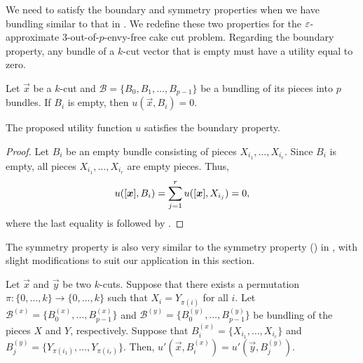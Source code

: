 We need to satisfy the boundary and symmetry properties when we have bundling similar to that in . We redefine these two properties for the $\varepsilon$-approximate 3-out-of-$p$-envy-free cake cut problem. Regarding the boundary property, any bundle of a $k$-cut vector that is empty must have a utility equal to zero.


\begin{property}[Boundary]\label{prt:boundary-condition-2}
    Let $\vec{x}$ be a $k$-cut and $\mathcal{B} = \{B_0, B_1, \ldots, B_{p-1} \}$ be a bundling of its pieces into $p$ bundles. If $B_i$ is empty, then $u(\vec{x}, B_i) = 0$. 
\end{property}

\begin{claim}\label{clm:boundary-condition-hold-2}
    The proposed utility function $u$ 
    satisfies the boundary property.    
\end{claim}

\begin{proof}
    Let $B_i$ be an empty bundle consisting of pieces $ X_{i_1}, \ldots, X_{i_r}$. Since $B_i$ is empty, all pieces $X_{i_1}, \ldots, X_{i_r}$ are empty pieces. Thus,
    \begin{align*}
        u([\boldsymbol{x}], B_i) = \sum_{j=1}^r u([\boldsymbol{x}], X_{i_j}) = 0,
    \end{align*}
    where the last equality is followed by .
\end{proof}











The symmetry property is also very similar to the symmetry property () in , with slight modifications to suit our application in this section.


\begin{property}[symmetry]\label{prt:first-symmetric-2}
    Let $\vec{x}$ and $\vec{y}$ be two $k$-cuts. Suppose that there exists a permutation $\pi: \{0, \ldots, k\} \rightarrow \{0, \ldots, k\}$ such that $X_i = Y_{\pi(i)}$ for all $i$. Let $\mathcal{B}^{(x)} = \{B^{(x)}_0, \ldots, B^{(x)}_{p-1} \}$ and $\mathcal{B}^{(y)} = \{B^{(y)}_0, \ldots, B^{(y)}_{p-1} \}$ be bundling of the pieces $X$ and $Y$, respectively. Suppose that $B^{(x)}_i = \{X_{i_1}, \ldots, X_{i_r}  \}$ and $B^{(y)}_j = \{Y_{\pi(i_1)}, \ldots, Y_{\pi(i_r)} \}$. Then, $u'(\vec{x}, B^{(x)}_i) = u'(\vec{y}, B^{(y)}_j)$.
\end{property}


